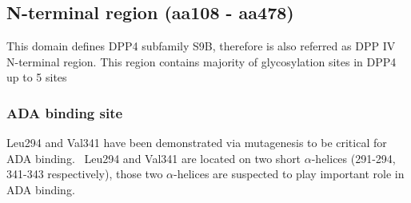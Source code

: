 \subsection{N-terminal region (aa108 - aa478)}

This domain defines DPP4 subfamily S9B, therefore is also referred as DPP IV N-terminal region. This region contains majority of  glycosylation sites in DPP4 up to 5 sites 

\subsubsection{ADA binding site}
Leu294 and Val341 have been demonstrated via mutagenesis to be critical for ADA binding.~\cite{Abbott_1999} Leu294 and Val341 are located on two short $\alpha$-helices (291-294, 341-343 respectively), those two $\alpha$-helices are suspected to play important role in ADA binding. 